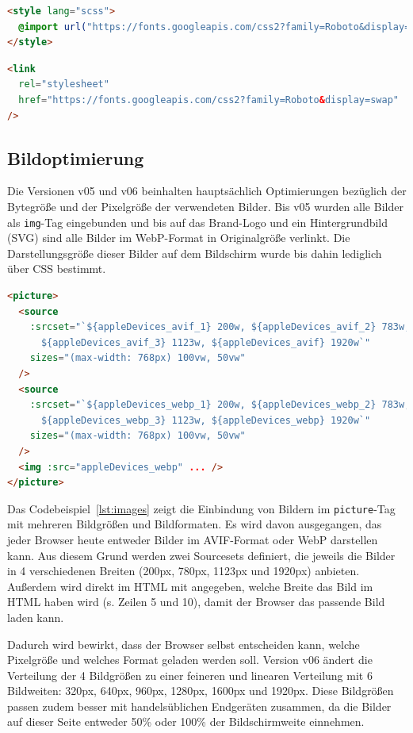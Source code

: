 \documentclass[11pt,a4paper]{article}
\begin{document}
\begin{lstlisting}[language=html, caption={Chained Request im Vue-Template}, label={lst:chained}]
<style lang="scss">
  @import url("https://fonts.googleapis.com/css2?family=Roboto&display=swap");
</style>
\end{lstlisting}
\begin{lstlisting}[language=html, caption={\enquote{Un-Chained} Request im HTML (index.html)}, label={lst:unchained}]
<link
  rel="stylesheet"
  href="https://fonts.googleapis.com/css2?family=Roboto&display=swap"
/>
\end{lstlisting}

\subsection{Bildoptimierung}\label{subsec:images}
Die Versionen v05 und v06 beinhalten hauptsächlich Optimierungen bezüglich der Bytegröße und der Pixelgröße der verwendeten Bilder.
Bis v05 wurden alle Bilder als \verb|img|-Tag eingebunden und bis auf das Brand-Logo und ein Hintergrundbild (SVG) sind alle Bilder im WebP-Format in Originalgröße verlinkt.
Die Darstellungsgröße dieser Bilder auf dem Bildschirm wurde bis dahin lediglich über CSS bestimmt.

\begin{lstlisting}[language=html, caption={Einbindung von Bildern als picture-Tag}, label={lst:images}]
<picture>
  <source
    :srcset="`${appleDevices_avif_1} 200w, ${appleDevices_avif_2} 783w,
      ${appleDevices_avif_3} 1123w, ${appleDevices_avif} 1920w`"
    sizes="(max-width: 768px) 100vw, 50vw"
  />
  <source
    :srcset="`${appleDevices_webp_1} 200w, ${appleDevices_webp_2} 783w,
      ${appleDevices_webp_3} 1123w, ${appleDevices_webp} 1920w`"
    sizes="(max-width: 768px) 100vw, 50vw"
  />
  <img :src="appleDevices_webp" ... />
</picture>
\end{lstlisting}

Das Codebeispiel~\ref{lst:images} zeigt die Einbindung von Bildern im \verb|picture|-Tag mit mehreren Bildgrößen und Bildformaten.
Es wird davon ausgegangen, das jeder Browser heute entweder Bilder im AVIF-Format oder WebP darstellen kann.
Aus diesem Grund werden zwei Sourcesets definiert, die jeweils die Bilder in 4 verschiedenen Breiten (200px, 780px, 1123px und 1920px) anbieten.
Außerdem wird direkt im HTML mit angegeben, welche Breite das Bild im HTML haben wird (s. Zeilen 5 und 10), damit der Browser das passende Bild laden kann.

Dadurch wird bewirkt, dass der Browser selbst entscheiden kann, welche Pixelgröße und welches Format geladen werden soll.
Version v06 ändert die Verteilung der 4 Bildgrößen zu einer feineren und linearen Verteilung mit 6 Bildweiten: 320px, 640px, 960px, 1280px, 1600px und 1920px.
Diese Bildgrößen passen zudem besser mit handelsüblichen Endgeräten zusammen, da die Bilder auf dieser Seite entweder 50\% oder 100\% der Bildschirmweite einnehmen.   
\end{document}
